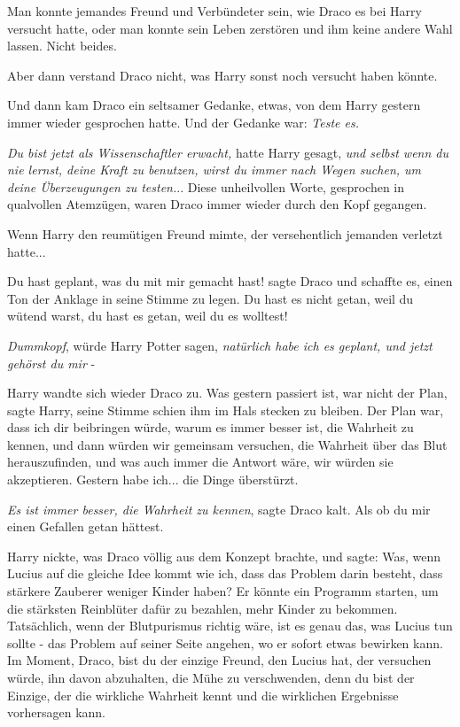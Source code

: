 Man konnte jemandes Freund und Verbündeter sein, wie Draco es bei Harry versucht
hatte, oder man konnte sein Leben zerstören und ihm keine andere Wahl lassen.
Nicht beides.

Aber dann verstand Draco nicht, was Harry sonst noch versucht haben könnte.

Und dann kam Draco ein seltsamer Gedanke, etwas, von dem Harry gestern immer
wieder gesprochen hatte. Und der Gedanke war: \emph{Teste es.}

\emph{Du bist jetzt als Wissenschaftler erwacht,} hatte Harry gesagt, \emph{und
selbst wenn du nie lernst, deine Kraft zu benutzen, wirst du immer nach Wegen
suchen, um deine Überzeugungen zu testen.}.. Diese unheilvollen Worte,
gesprochen in qualvollen Atemzügen, waren Draco immer wieder durch den Kopf
gegangen.

Wenn Harry den reumütigen Freund mimte, der versehentlich jemanden verletzt
hatte...

\glqq{}Du hast geplant, was du mit mir gemacht hast!\grqq{} sagte Draco und
schaffte es, einen Ton der Anklage in seine Stimme zu legen. \glqq{}Du hast es
nicht getan, weil du wütend warst, du hast es getan, weil du es wolltest!\grqq{}

\emph{Dummkopf}, würde Harry Potter sagen, \emph{natürlich habe ich es geplant,
und jetzt gehörst du mir} -

Harry wandte sich wieder Draco zu. \glqq{}Was gestern passiert ist, war nicht
der Plan\grqq{}, sagte Harry, seine Stimme schien ihm im Hals stecken zu
bleiben. \glqq{}Der Plan war, dass ich dir beibringen würde, warum es immer
besser ist, die Wahrheit zu kennen, und dann würden wir gemeinsam versuchen, die
Wahrheit über das Blut herauszufinden, und was auch immer die Antwort wäre, wir
würden sie akzeptieren. Gestern habe ich... die Dinge überstürzt.\grqq{}

\glqq{}\emph{Es ist immer besser, die Wahrheit zu kennen}\grqq{}, sagte Draco
kalt. \glqq{}Als ob du mir einen Gefallen getan hättest.\grqq{}

Harry nickte, was Draco völlig aus dem Konzept brachte, und sagte: \glqq{}Was,
wenn Lucius auf die gleiche Idee kommt wie ich, dass das Problem darin besteht,
dass stärkere Zauberer weniger Kinder haben? Er könnte ein Programm starten, um
die stärksten Reinblüter dafür zu bezahlen, mehr Kinder zu bekommen.
Tatsächlich, wenn der Blutpurismus richtig wäre, ist es genau das, was Lucius
tun sollte - das Problem auf seiner Seite angehen, wo er sofort etwas bewirken
kann. Im Moment, Draco, bist du der einzige Freund, den Lucius hat, der
versuchen würde, ihn davon abzuhalten, die Mühe zu verschwenden, denn du bist
der Einzige, der die wirkliche Wahrheit kennt und die wirklichen Ergebnisse
vorhersagen kann.\grqq{}

